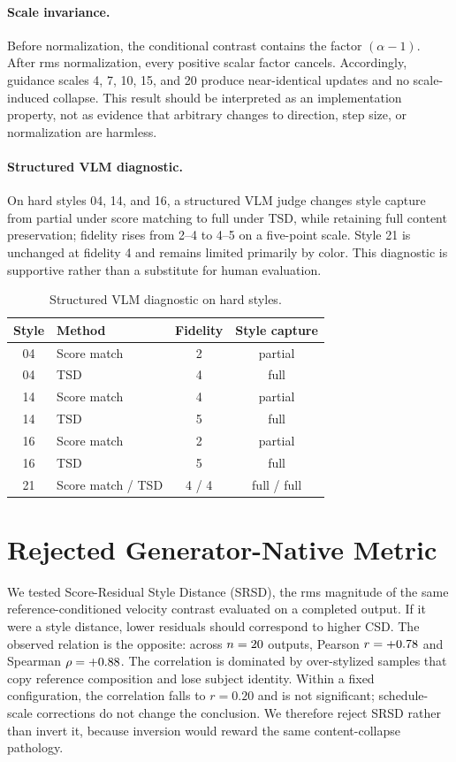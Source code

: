 \documentclass[letterpaper]{article}
\begin{document}
\paragraph{Scale invariance.}
Before normalization, the conditional contrast contains the factor
$(\alpha-1)$. After rms normalization, every positive scalar factor cancels.
Accordingly, guidance scales 4, 7, 10, 15, and 20 produce near-identical
updates and no scale-induced collapse. This result should be interpreted as an
implementation property, not as evidence that arbitrary changes to direction,
step size, or normalization are harmless.

\paragraph{Structured VLM diagnostic.}
On hard styles 04, 14, and 16, a structured VLM judge changes style capture
from partial under score matching to full under TSD, while retaining full
content preservation; fidelity rises from 2--4 to 4--5 on a five-point scale.
Style 21 is unchanged at fidelity 4 and remains limited primarily by color.
This diagnostic is supportive rather than a substitute for human evaluation.

\begin{table}[t]
\centering
\caption{Structured VLM diagnostic on hard styles.}
\label{tab:supp-vlm}
\footnotesize
\setlength{\tabcolsep}{4pt}
\begin{tabular}{clcc}
\toprule
Style & Method & Fidelity & Style capture \\
\midrule
04 & Score match & 2 & partial \\
04 & TSD & 4 & full \\
14 & Score match & 4 & partial \\
14 & TSD & 5 & full \\
16 & Score match & 2 & partial \\
16 & TSD & 5 & full \\
21 & Score match / TSD & 4 / 4 & full / full \\
\bottomrule
\end{tabular}
\end{table}

\section{Rejected Generator-Native Metric}

We tested Score-Residual Style Distance (SRSD), the rms magnitude of the same
reference-conditioned velocity contrast evaluated on a completed output. If it
were a style distance, lower residuals should correspond to higher CSD. The
observed relation is the opposite: across $n=20$ outputs, Pearson
$r=+0.78$ and Spearman $\rho=+0.88$. The correlation is
dominated by over-stylized samples that copy reference composition and lose
subject identity. Within a fixed configuration, the correlation falls to
$r=0.20$ and is not significant; schedule-scale corrections do not change the
conclusion. We therefore reject SRSD rather than invert it, because inversion
would reward the same content-collapse pathology.
\end{document}
